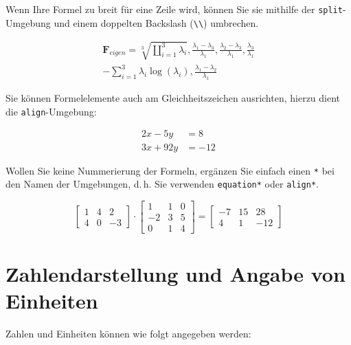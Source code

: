 Wenn Ihre Formel zu breit für eine Zeile wird, können Sie sie mithilfe der \texttt{split}-Umgebung und einem doppelten Backslash (\verb+\\+) umbrechen.

\begin{equation}
\label{eq:4}
\begin{split}
\mathbf{F}_{{eigen}}=\sqrt[3]{\coprod_{i=1}^{3} \lambda_{i}},
\frac{\lambda_{1}-\lambda_{3}}{\lambda_{1}},
\frac{\lambda_{2}-\lambda_{3}}{\lambda_{1}},
\frac{\lambda_{3}}{\lambda_{1}} \\-
\sum_{i=1}^{3} \lambda_{i} \log \left(\lambda_{i}\right),
\frac{\lambda_{1}-\lambda_{2}}{\lambda_{1}}
\end{split}
\end{equation}

Sie können Formelelemente auch am Gleichheitszeichen ausrichten, hierzu dient die \texttt{align}-Umgebung:

\begin{align}
2x - 5y &=  8 \\
3x + 92y &=  -12
\end{align}

Wollen Sie keine Nummerierung der Formeln, ergänzen Sie einfach einen \texttt{*} bei den Namen der Umgebungen, d.\,h. Sie verwenden \texttt{equation*} oder \texttt{align*}.

\begin{equation*}
\begin{bmatrix}
   1 &  4 &  2 \\
   4 &  0 & -3
\end{bmatrix}
        \cdot
\begin{bmatrix}
   1 &  1 &  0 \\
  -2 &  3 &  5 \\
   0 &  1 &  4
\end{bmatrix}
       {=}
\begin{bmatrix}
  -7 &  15 &  28 \\
   4 &   1 & -12
\end{bmatrix}
\end{equation*}

\section{Zahlendarstellung und Angabe von Einheiten}
Zahlen und Einheiten können wie folgt angegeben werden: 

